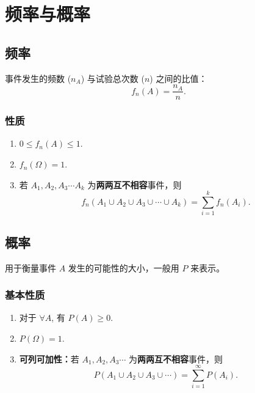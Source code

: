 \documentclass[12pt, a4paper, oneside, UTF8]{ctexbook}
\begin{document}
\section{频率与概率}

\subsection{频率}
\begin{defn}
    事件发生的频数 (\(n_A\)) 与试验总次数 (\(n\)) 之间的比值：
    \[
        f_n\left(A\right) = \frac{n_A}{n}.
    \]
\end{defn}

\subsubsection{性质}
\begin{enumerate}
    \item \(0 \leqslant f_n\left(A\right) \leqslant 1\).
    \item \(f_n\left(\Omega\right) = 1\).
    \item 若 \(A_1 , A_2 , A_3 \cdots A_k\) 为\textbf{两两互不相容}事件，则\[f_n\left(A_1\cup A_2 \cup A_3 \cup \cdots \cup A_k\right) = \sum_{i = 1}^{k} f_n\left(A_i\right).\]
\end{enumerate}

\subsection{概率}

用于衡量事件 \(A\) 发生的可能性的大小，一般用 \(P\) 来表示。

\subsubsection{基本性质}
\begin{enumerate}
    \item 对于 \(\forall A\), 有 \(P\left(A\right) \geqslant 0\).
    \item \(P\left(\Omega\right) = 1\).
    \item \textbf{可列可加性：}若 \(A_1 , A_2 , A_3 \cdots\) 为\textbf{两两互不相容}事件，则\[P\left(A_1\cup A_2 \cup A_3 \cup \cdots\right) = \sum_{i = 1}^{\infty}P\left(A_i\right).\]
\end{enumerate}
\end{document}

